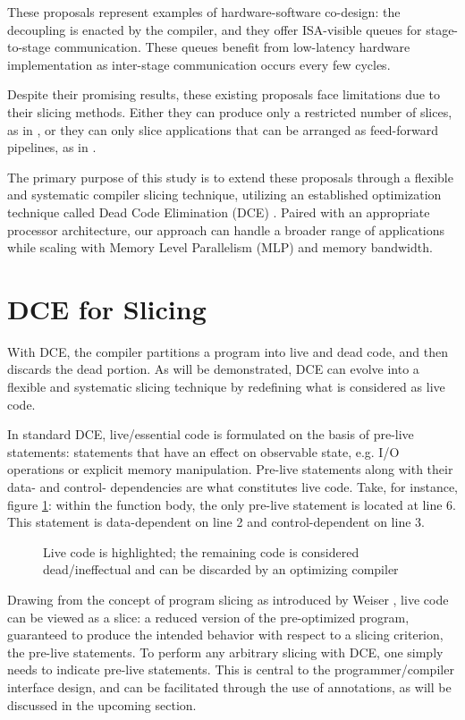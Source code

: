 \documentclass{acaces}
\begin{document}
These proposals represent examples of hardware-software co-design:
the decoupling is enacted by the compiler, and they offer ISA-visible queues for stage-to-stage communication.
These queues benefit from low-latency hardware implementation as inter-stage communication occurs every few cycles.

Despite their promising results, these existing proposals face limitations due to their slicing methods.
Either they can produce only a restricted number of slices, as in \cite{Manocha2021},
or they can only slice applications that can be arranged as feed-forward pipelines, as in \cite{Nguyen2023}.

The primary purpose of this study is to extend these proposals through a flexible and systematic compiler slicing technique,
utilizing an established optimization technique called Dead Code Elimination (DCE) \cite{cytron_efficiently_1991}.
Paired with an appropriate processor architecture, our approach can handle a broader range of applications while scaling
with Memory Level Parallelism (MLP) and memory bandwidth.

\section{DCE for Slicing}

With DCE, the compiler partitions a program into live and dead code, and then discards the dead portion.
As will be demonstrated, DCE can evolve into a flexible and systematic slicing technique by redefining what is considered as live code.

In standard DCE, live/essential code is formulated on the basis of pre-live statements:
statements that have an effect on observable state, e.g. I/O operations or explicit memory manipulation.
Pre-live statements along with their data- and control- dependencies are what constitutes live code.
Take, for instance, figure \ref{fig:dce}: within the function body, the only pre-live statement is located at line 6.
This statement is data-dependent on line 2 and control-dependent on line 3.

\begin{figure}[ht]
  \centering
  
  \caption{Live code is highlighted; the remaining code is considered dead/ineffectual and can be discarded by an optimizing compiler}
  \label{fig:dce}
\end{figure}

Drawing from the concept of program slicing as introduced by Weiser \cite{Weiser1984}, live code can be viewed as a slice:
a reduced version of the pre-optimized program, guaranteed to produce the intended behavior with respect to a slicing criterion, the pre-live statements.
To perform any arbitrary slicing with DCE, one simply needs to indicate pre-live statements.
This is central to the programmer/compiler interface design,
and can be facilitated through the use of annotations,
as will be discussed in the upcoming section.
\end{document}
